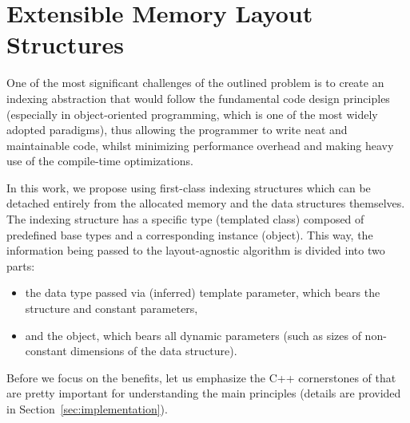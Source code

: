 \section{Extensible Memory Layout Structures}\label{sec:layouts}

One of the most significant challenges of the outlined problem is to create an indexing abstraction that would follow the fundamental code design principles (especially in object-oriented programming, which is one of the most widely adopted paradigms), thus allowing the programmer to write neat and maintainable code, whilst minimizing performance overhead and making heavy use of the compile-time optimizations.

In this work, we propose using first-class indexing structures which can be detached entirely from the allocated memory and the data structures themselves. The indexing structure has a specific type (templated class) composed of predefined base types and a corresponding instance (object). This way, the information being passed to the layout-agnostic algorithm is divided into two parts:
\begin{itemize}
\item the data type passed via (inferred) template parameter, which bears the structure and constant parameters,
\item and the object, which bears all dynamic parameters (such as sizes of non-constant dimensions of the data structure).
\end{itemize}

Before we focus on the benefits, let us emphasize the C++ cornerstones of \Noarr{} that are pretty important for understanding the main principles (details are provided in Section~\ref{sec:implementation}).

